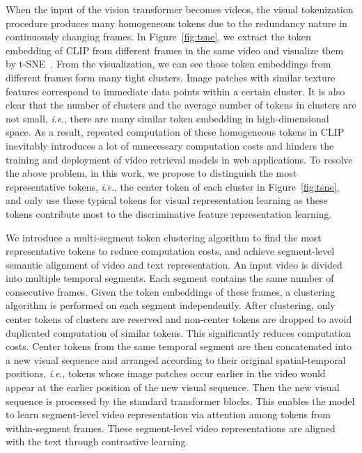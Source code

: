 \documentclass[sigconf]{acmart}
\newcommand{\ie}{\textit{i}.\textit{e}.}
\begin{document}
When the input of the vision transformer becomes videos,
the visual tokenization procedure produces many homogeneous tokens
due to the redundancy nature in continuously changing frames.
In Figure~\ref{fig:tsne}, we extract the token embedding of CLIP from different frames in the same video and visualize them by t-SNE~\cite{2008Visualizing}.
From the visualization,
we can see those token embeddings from different frames form many tight clusters.
Image patches with similar texture features correspond to
immediate data points within a certain cluster.
It is also clear that
the number of clusters and the average number of tokens in clusters
are not small,
\ie, there are many similar token embedding in high-dimensional space.
As a result, repeated computation of these homogeneous tokens in CLIP inevitably
introduces a lot of unnecessary computation costs and hinders the training and deployment
of video retrieval models in web applications.
To resolve the above problem, in this work, we propose to
distinguish the most representative tokens,
\ie, the center token of each cluster in Figure~\ref{fig:tsne},
and only use these typical tokens for visual representation
learning as these tokens
contribute most to the discriminative
feature representation learning.

We introduce a multi-segment token clustering
algorithm to find the most representative tokens to reduce computation costs,
and achieve segment-level semantic alignment of video and text representation.
An input video is divided into multiple temporal segments. Each segment
contains the same number of consecutive frames.
Given the token embeddings of these frames,
a clustering algorithm is performed on each segment independently.
After clustering, only center tokens of clusters
are reserved and non-center tokens are dropped to 
avoid duplicated computation of similar tokens.
This significantly reduces computation costs.
Center tokens from the same temporal segment are
then concatenated into a new
visual sequence and arranged according
to their original spatial-temporal positions, \ie,
tokens whose image patches occur earlier in the video would appear at the earlier position of the new visual sequence.
Then the new visual sequence is processed by the standard transformer blocks.
This enables the model to learn segment-level video representation via attention among
tokens from within-segment frames.
These segment-level video representations are aligned with
the text through contrastive learning.
\end{document}
